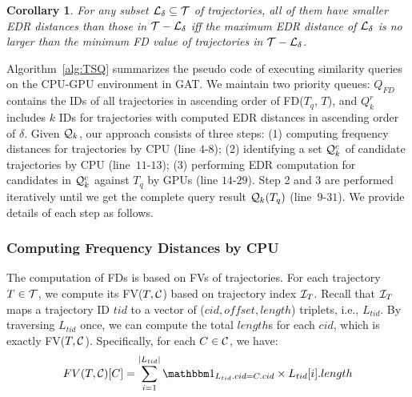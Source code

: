 \documentclass[10pt,conference,letterpaper]{IEEEtran}
\newcommand{\frname}{GAT\xspace }
\newcommand{\simq}{{{\cal Q}_k}\xspace}
\newcommand{\simcand}{{{\cal Q}_k^c}\xspace}
\newcommand{\alltraj}{{{\cal T}}\xspace}
\newcommand{\edr}{{\delta}\xspace}
\newcommand{\allcell}{{\cal C}\xspace}
\newcommand{\trajindex}{{{\cal I}_T}\xspace}
\newcommand{\knownedr}{{{\cal L}_\edr}\xspace}
\newtheorem{corollary}{Corollary}
\begin{document}
\begin{corollary}\label{cor:lb}
	For any subset $\knownedr\subseteq \alltraj$ of trajectories, all of them have smaller EDR distances than those in $\alltraj-\knownedr$ iff the maximum EDR distance of $\knownedr$ is no larger than the minimum FD value of trajectories in $\alltraj-\knownedr$.
\end{corollary}






Algorithm~\ref{alg:TSQ} summarizes the pseudo code of executing similarity queries on the CPU-GPU environment in \frname.
We maintain two priority queues: ${Q}_{FD}$ contains the IDs of all trajectories in ascending order of FD($T_q$, $T$), and ${Q}_{k}^r$ includes $k$ IDs for trajectories with computed EDR distances in ascending order of $\edr$.
Given $\simq$, our approach consists of three steps: (1) computing frequency distances for trajectories by CPU (line $4$-$8$); (2) identifying a set $\simcand$ of candidate trajectories by CPU (line~$11$-$13$); (3) performing EDR computation for candidates in $\simcand$ against $T_q$ by GPUs (line $14$-$29$). Step 2 and 3 are performed iteratively until we get the complete query result $\simq(T_q)$ (line~$9$-$31$).
We provide details of each step as follows.


\subsubsection{Computing Frequency Distances by CPU}
The computation of FDs is based on FVs of trajectories. For each trajectory $T\in\alltraj$, we compute its FV($T,\allcell$) based on trajectory index $\trajindex$. Recall that $\trajindex$ maps a trajectory ID $tid$ to a vector of ($cid, offset, length$) triplets, i.e., $L_{tid}$. By traversing $L_{tid}$ once, we can compute the total $length$s for each $cid$, which is exactly FV($T,\allcell$). Specifically, for each $C\in\allcell$, we have:
\begin{equation}
\small
	FV(T,\allcell)[C] = \sum_{i=1}^{|L_{tid}|} {{\mathbbm 1}_{L_{tid}.cid = C.cid} \times L_{tid}[i].length }
\end{equation}
\end{document}
